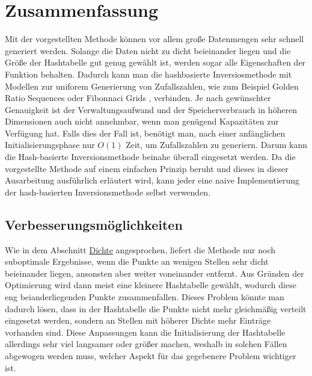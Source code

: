 \section{Zusammenfassung}
Mit der vorgestellten Methode können vor allem große Datenmengen sehr schnell generiert werden. 
Solange die Daten nicht zu dicht beieinander liegen und die Größe der Hashtabelle gut genug gewählt 
ist, werden sogar alle Eigenschaften der Funktion behalten. Dadurch kann man die hashbasierte 
Inversiosmethode mit Modellen zur uniforem Generierung von Zufallszahlen, wie zum Beispiel Golden 
Ratio Sequences \cite{schretter-golden_ratio_sequences-2012} oder Fibonnaci Grids 
\cite{frisch_hanebeck-deterministic_gaussian_sampling-2021}, verbinden. Je nach gewünschter 
Genauigkeit ist der Verwaltungsaufwand und der Speicherverbrauch in höheren Dimensionen auch 
nicht annehmbar, wenn man genügend Kapazitäten zur Verfügung hat. Falls dies der Fall ist, benötigt 
man, nach einer anfänglichen Initialisierungsphase nur $O(1)$ Zeit, um Zufallszahlen zu generiern. 
Darum kann die Hash-basierte Inversionsmethode beinahe überall eingesetzt werden. Da die 
vorgestellte Methode auf einem einfachen Prinzip beruht und dieses in dieser Ausarbeitung ausführlich 
erläutert wird, kann jeder eine naive Implementierung der hash-basierten Inversionsmethode selbst verwenden.


\subsection{Verbesserungsmöglichkeiten}
Wie in dem Abschnitt \hyperref[Dichte]{Dichte} angesprochen, liefert die Methode nur noch 
suboptimale Ergebnisse, wenn die Punkte an wenigen Stellen sehr dicht beieinander liegen, 
ansonsten aber weiter voneinander entfernt. Aus Gründen der Optimierung wird dann meist eine 
kleinere Hashtabelle gewählt, wodurch diese eng beianderliegenden Punkte zusammenfallen.
Dieses Problem könnte man dadurch lösen, dass in der Hashtabelle die Punkte nicht mehr 
gleichmäßig verteilt eingesetzt werden, sondern an Stellen mit höherer Dichte mehr Einträge 
vorhanden sind. Diese Anpassungen kann die Initialisierung der Hashtabelle allerdings sehr 
viel langsamer oder größer machen, weshalb in solchen Fällen abgewogen werden muss, welcher 
Aspekt für das gegebenere Problem wichtiger ist.


